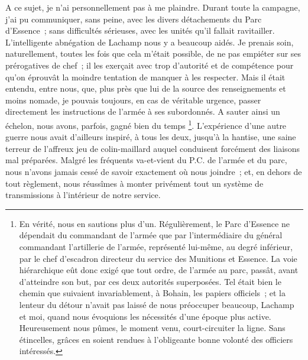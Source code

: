 \documentclass[french,twoside]{book} %
\begin{document}
A ce sujet, je n’ai personnellement pas à me plaindre. Durant toute la campagne, j’ai pu communiquer, sans peine, avec les divers détachements du Parc d’Essence ; sans difficultés sérieuses, avec les unités qu’il fallait ravitailler. L’intelligente abnégation de Lachamp nous y a beaucoup aidés. Je prenais soin, naturellement, toutes les fois que cela m’était possible, de ne pas empiéter sur ses prérogatives de chef ; il les exerçait avec trop d’autorité et de compétence pour qu’on éprouvât la moindre tentation de manquer à les respecter. Mais il était entendu, entre nous, que, plus près que lui de la source des renseignements et moins nomade, je pouvais toujours, en cas de véritable urgence, passer directement les instructions de l’armée à ses subordonnés. A sauter ainsi un échelon, nous avons,   parfois, gagné bien du temps \footnote{En vérité, nous en sautions plus d’un. Régulièrement, le Parc d’Essence ne dépendait du commandant de l’armée que par l’intermédiaire du général commandant l’artillerie de l’armée, représenté lui-même, au degré inférieur, par le chef d’escadron directeur du service des Munitions et Essence. La voie hiérarchique eût donc exigé que tout ordre, de l’armée au parc, passât, avant d’atteindre son but, par ces deux autorités superposées. Tel était bien le chemin que suivaient invariablement, à Bohain, les papiers officiels ; et la lenteur du détour n’avait pas laissé de nous préoccuper beaucoup, Lachamp et moi, quand nous évoquions les nécessités d’une époque plus active. Heureusement nous pûmes, le moment venu, court-circuiter la ligne. Sans étincelles, grâces en soient rendues à l’obligeante bonne volonté des officiers intéressés.}. L’expérience d’une autre guerre nous avait d’ailleurs inspiré, à tous les deux, jusqu’à la hantise, une saine terreur de l’affreux jeu de colin-maillard auquel conduisent forcément des liaisons mal préparées. Malgré les fréquents va-et-vient du P.C. de l’armée et du parc, nous n’avons jamais cessé de savoir exactement où nous joindre ; et, en dehors de tout règlement, nous réussîmes à monter privément tout un système de transmissions à l’intérieur de notre service.\par
\end{document}
